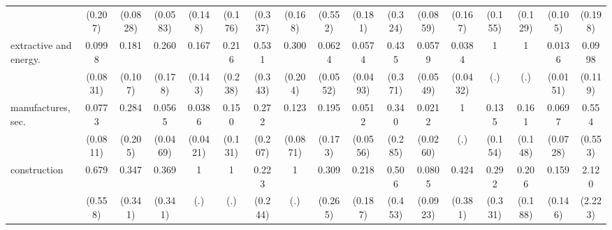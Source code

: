 {\begin{tabular}{l*{16}{c}}
                    &     (0.207)         &    (0.0828)         &    (0.0583)         &     (0.148)         &     (0.176)         &     (0.337)         &     (0.168)         &     (0.552)         &     (0.181)         &     (0.324)         &    (0.0859)         &     (0.167)         &     (0.155)         &     (0.129)         &     (0.105)         &     (0.198)         \\
[1em]
extractive and energy.&      0.0998\sym{**} &       0.181\sym{**} &       0.260\sym{*}  &       0.167\sym{*}  &       0.216         &       0.531         &       0.300         &      0.0624\sym{**} &      0.0574\sym{***}&       0.435         &      0.0579\sym{**} &      0.0384\sym{**} &           1         &           1         &      0.0136\sym{***}&      0.0998         \\
                    &    (0.0831)         &     (0.107)         &     (0.178)         &     (0.143)         &     (0.238)         &     (0.343)         &     (0.204)         &    (0.0552)         &    (0.0493)         &     (0.371)         &    (0.0549)         &    (0.0432)         &         (.)         &         (.)         &    (0.0151)         &     (0.119)         \\
[1em]
manufactures, sec.  &      0.0773\sym{*}  &       0.284         &      0.0565\sym{***}&      0.0386\sym{**} &       0.150\sym{*}  &       0.272         &       0.123\sym{**} &       0.195         &      0.0512\sym{**} &       0.340         &      0.0212\sym{**} &           1         &       0.135         &       0.161\sym{*}  &      0.0697\sym{*}  &       0.554         \\
                    &    (0.0811)         &     (0.205)         &    (0.0469)         &    (0.0421)         &     (0.131)         &     (0.207)         &    (0.0871)         &     (0.173)         &    (0.0556)         &     (0.285)         &    (0.0260)         &         (.)         &     (0.154)         &     (0.148)         &    (0.0728)         &     (0.553)         \\
[1em]
construction        &       0.679         &       0.347         &       0.369         &           1         &           1         &       0.223         &           1         &       0.309         &       0.218         &       0.506         &      0.0805\sym{*}  &       0.424         &       0.292         &       0.206         &       0.159\sym{*}  &       2.120         \\
                    &     (0.558)         &     (0.341)         &     (0.341)         &         (.)         &         (.)         &     (0.244)         &         (.)         &     (0.265)         &     (0.187)         &     (0.453)         &    (0.0923)         &     (0.381)         &     (0.331)         &     (0.188)         &     (0.146)         &     (2.223)         \\

\end{tabular}}
